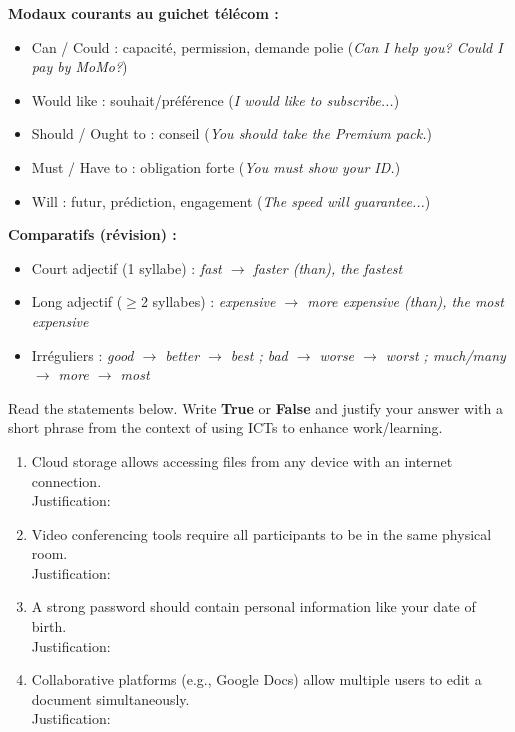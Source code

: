 \documentclass[11pt]{article}
\newcommand{\cle}[1]{{\popxbold\color{popdark}#1}}
\begin{document}
\begin{aretenir}
\textbf{Modaux courants au guichet télécom :}
\begin{itemize}
\item \cle{Can / Could} : capacité, permission, demande polie (\textit{Can I help you? Could I pay by MoMo?})
\item \cle{Would like} : souhait/préférence (\textit{I would like to subscribe...})
\item \cle{Should / Ought to} : conseil (\textit{You should take the Premium pack.})
\item \cle{Must / Have to} : obligation forte (\textit{You must show your ID.})
\item \cle{Will} : futur, prédiction, engagement (\textit{The speed will guarantee...})
\end{itemize}
\textbf{Comparatifs (révision) :}
\begin{itemize}
\item Court adjectif (1 syllabe) : \textit{fast $\to$ faster (than), the fastest}
\item Long adjectif ($\ge$2 syllabes) : \textit{expensive $\to$ more expensive (than), the most expensive}
\item Irréguliers : \textit{good $\to$ better $\to$ best ; bad $\to$ worse $\to$ worst ; much/many $\to$ more $\to$ most}
\end{itemize}
\end{aretenir}

\begin{exercice}
Read the statements below. Write \textbf{True} or \textbf{False} and justify your answer with a short phrase from the context of using ICTs to enhance work/learning.

\begin{enumerate}
\item Cloud storage allows accessing files from any device with an internet connection. \hfill \framebox[1.5cm]{} \\
Justification: \dotfill
\item Video conferencing tools require all participants to be in the same physical room. \hfill \framebox[1.5cm]{} \\
Justification: \dotfill
\item A strong password should contain personal information like your date of birth. \hfill \framebox[1.5cm]{} \\
Justification: \dotfill
\item Collaborative platforms (e.g., Google Docs) allow multiple users to edit a document simultaneously. \hfill \framebox[1.5cm]{} \\
Justification: \dotfill
\end{enumerate}
\end{exercice}
\end{document}
